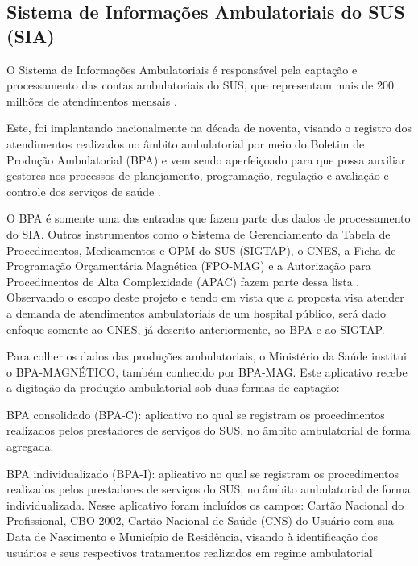 \subsection{\textbf{Sistema de Informações Ambulatoriais do SUS (SIA)}}

O Sistema de Informações Ambulatoriais é responsável pela captação e processamento das contas ambulatoriais do SUS, que representam mais de 200 milhões de atendimentos mensais \cite{garcia}.

Este, foi implantando nacionalmente na década de noventa, visando o registro dos atendimentos realizados no âmbito ambulatorial por meio do Boletim de Produção Ambulatorial (BPA) e vem sendo aperfeiçoado para que possa auxiliar gestores nos processos de planejamento, programação, regulação e avaliação e controle dos serviços de saúde \cite{manualsiasus}.

O BPA é somente uma das entradas que fazem parte dos dados de processamento do SIA. Outros instrumentos como o Sistema de Gerenciamento da Tabela de Procedimentos, Medicamentos e OPM do SUS (SIGTAP), o CNES, a Ficha de Programação Orçamentária Magnética (FPO-MAG) e a Autorização para Procedimentos de Alta Complexidade (APAC) fazem parte dessa lista \cite{manualsiasus}. Observando o escopo deste projeto e tendo em vista que a proposta visa atender a demanda de atendimentos ambulatoriais de um hospital público, será dado enfoque somente ao CNES, já descrito anteriormente, ao BPA e ao SIGTAP.

Para colher os dados das produções ambulatoriais, o Ministério da Saúde institui o BPA-MAGNÉTICO, também conhecido por BPA-MAG. Este aplicativo recebe a digitação da produção ambulatorial sob duas formas de captação: 

\begin{citacao}
BPA consolidado (BPA-C): aplicativo no qual se registram os procedimentos realizados pelos prestadores de serviços do SUS, no âmbito ambulatorial de forma agregada.

BPA individualizado (BPA-I): aplicativo no qual se registram os procedimentos realizados pelos prestadores de serviços do SUS, no âmbito ambulatorial de forma individualizada. Nesse aplicativo foram incluídos os campos: Cartão Nacional do Profissional, CBO 2002, Cartão Nacional de Saúde (CNS) do Usuário com sua Data de Nascimento e Município de Residência, visando à identificação dos usuários e seus respectivos tratamentos realizados em regime ambulatorial \cite[p. 09]{manualsiasus}

\end{citacao}

